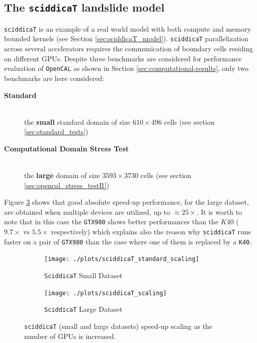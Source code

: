 \subsection{The \texttt{sciddicaT} landslide model}
\texttt{sciddicaT} is an example of a real world model with both compute and memory bounded kernels (see Section \ref{sec:sciddicaT_model}). \texttt{sciddicaT} parallelization across several accelerators requires the communication of boundary cells residing on different GPUs.
Despite three benchmarks are considered for performance evaluation of \texttt{OpenCAL} as shown in Section \ref{sec:computational-results}, only two benchmarks are here considered: 
\begin{description}
	\item[\textbf{Standard}]\hfil \\ the \textbf{small} standard domain of size $610 \times 496$ cells (see section \ref{sec:standard_tests})
	\item[\textbf{Computational Domain Stress Test}]\hfil \\ the \textbf{large}  domain of size $3593 \times 3730$ cells (see section \ref{sec:opencal_stress_testR})
\end{description}
Figure \ref{fig:sciddica_scaling} shows that good absolute speed-up performance, for the large dataset, are obtained when multiple devices are utilized, up to $\approx 25 \times$. It is worth to note that in this case the \texttt{GTX980} shows better performances than the $K40$ ( $9.7\times$ vs $5.5 \times$ respectively) which explains also the reason why \texttt{sciddicaT} runs faster on a pair of \texttt{GTX980} than the case where one of them is replaced by a \texttt{K40}.
\begin{figure}[!htb]	
	\begin{subfigure}{1.0\textwidth}
		\caption{\texttt{SciddicaT} Small Dataset}
		\label{fig:sciddica_standard_scaling}
		\texttt{[image: ./plots/sciddicaT\_standard\_scaling]}
	\end{subfigure}
	\endminipage
	
	\begin{subfigure}{1.0\textwidth}
		\caption{\texttt{SciddicaT} Large Dataset}
		\label{fig:sciddica_stress_scaling}
		\texttt{[image: ./plots/sciddicaT\_scaling]}
	\end{subfigure}
	\endminipage\hfill
	\caption[]{\texttt{sciddicaT} (small and large datasets) speed-up scaling as the number of GPUs is increased.}
	\label{fig:sciddica_scaling}
\end{figure}
